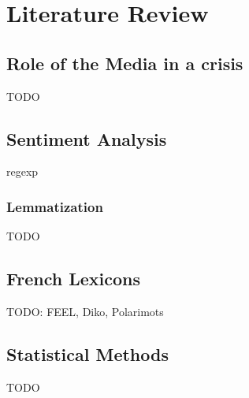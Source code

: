\chapter{Literature Review}\label{Literature Review}

\section{Role of the Media in a crisis}\label{Role of the Media in a crisis}

TODO

\section{Sentiment Analysis}\label{Sentiment Analysis}

regexp 

\subsection{Lemmatization}\label{lemmatization}

TODO

\section{French Lexicons}\label{French Lexicons}

TODO: FEEL, Diko, Polarimots

\section{Statistical Methods}\label{Statistical Methods}

TODO
